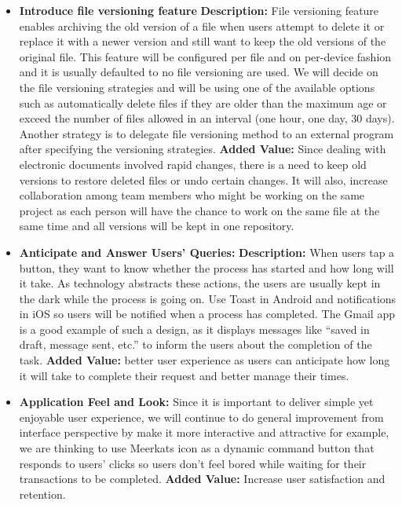 \documentclass{article}
\begin{document}
\begin{itemize}
\item \textbf{Introduce file versioning feature}
\textbf{Description:} File versioning feature enables archiving the old version of a file when users attempt to delete it or replace it with a newer version and still want to keep the old versions of the original file. This feature will be configured per file and on per-device fashion and it is usually defaulted to no file versioning are used.
We will decide on the file versioning strategies and will be using one of the available options such as automatically delete files if they are older than the maximum age or exceed the number of files allowed in an interval (one hour, one day, 30 days). Another strategy is to delegate file versioning method to an external program after specifying the versioning strategies.
\textbf{Added Value:} Since dealing with electronic documents involved rapid changes, there is a need to keep old versions to restore deleted files or undo certain changes. It will also, increase collaboration among team members who might be working on the same project as each person will have the chance to work on the same file at the same time and all versions will be kept in one repository.


\item \textbf{Anticipate and Answer Users’ Queries:}
\textbf{Description:} When users tap a button, they want to know whether the process has started and how long will it take. As technology abstracts these actions, the users are usually kept in the dark while the process is going on. Use Toast in Android and notifications in iOS so users will be notified when a process has completed. The Gmail app is a good example of such a design, as it displays messages like “saved in draft, message sent, etc.” to inform the users about the completion of the task.
\textbf{Added Value:} better user experience as users can anticipate how long it will take to complete their request and better manage their times.

\item \textbf{Application Feel and Look:} Since it is important to deliver simple yet enjoyable user experience, we will continue to do general improvement from interface perspective by make it more interactive and attractive for example, we are thinking to use Meerkats icon as a dynamic command button that responds to users’ clicks so users don’t feel bored while waiting for their transactions to be completed.
\textbf{Added Value:} Increase user satisfaction and retention.

\end{itemize}


\nocite{*}



\end{document}
